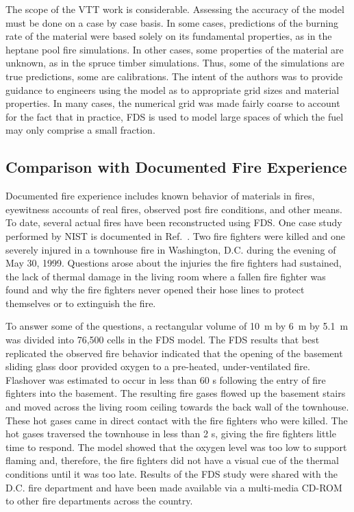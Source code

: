The scope of the VTT work is considerable. Assessing the accuracy of the model must be done on a case by case basis. In some cases, predictions of
the burning rate of the material were based solely on its fundamental properties, as in the heptane pool fire simulations. In other cases, some
properties of the material are unknown, as in the spruce timber simulations. Thus, some of the simulations are true predictions, some are
calibrations. The intent of the authors was to provide guidance to engineers using the model as to appropriate grid sizes and material properties. In
many cases, the numerical grid was made fairly coarse to account for the fact that in practice, FDS is used to model large spaces of which the fuel
may only comprise a small fraction.


\subsection{Comparison with Documented Fire Experience}

Documented fire experience includes known behavior of materials in fires, eyewitness accounts of real fires, observed post fire conditions, and other
means. To date, several actual fires have been reconstructed using FDS. One case study performed by NIST is documented in Ref.~\cite{Madrzykowski:1}.
Two fire fighters were killed and one severely injured in a townhouse fire in Washington, D.C. during the evening of May 30, 1999. Questions arose
about the injuries the fire fighters had sustained, the lack of thermal damage in the living room where a fallen fire fighter was found and why the
fire fighters never opened their hose lines to protect themselves or to extinguish the fire.

To answer some of the questions, a rectangular volume of 10~m by 6~m by 5.1~m was divided into 76,500 cells in the FDS model. The FDS results that
best replicated the observed fire behavior indicated that the opening of the basement sliding glass door provided oxygen to a pre-heated,
under-ventilated fire. Flashover was estimated to occur in less than 60 s following the entry of fire fighters into the basement. The resulting fire
gases flowed up the basement stairs and moved across the living room ceiling towards the back wall of the townhouse. These hot gases came in direct
contact with the fire fighters who were killed. The hot gases traversed the townhouse in less than 2 s, giving the fire fighters little time to
respond. The model showed that the oxygen level was too low to support flaming and, therefore, the fire fighters did not have a visual cue of the
thermal conditions until it was too late. Results of the FDS study were shared with the D.C. fire department and have been made available via a
multi-media CD-ROM to other fire departments across the country.

